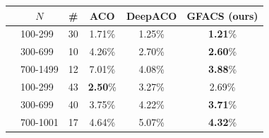 



\begin{tabular}{clcccc}
\midrule
& \multicolumn{1}{c}{$N$} & \# & ACO & DeepACO & GFACS (ours) \\
\midrule
\parbox[t]{2mm}{} & 100-299 & 30& 1.71\%& 1.25\%& \textbf{1.21}\% \\
& 300-699 & 10 & 4.26\% &2.70\% & \textbf{2.60}\% \\
& 700-1499 & 12 &7.01\% &4.08\% & \textbf{3.88}\% \\
\midrule
\parbox[t]{2mm}{} & 100-299 & 43 &\textbf{2.50}\% &3.27\% & 2.69\% \\
& 300-699 & 40 &3.75\% &4.22\% & \textbf{3.71}\% \\
& 700-1001 & 17 &4.64\% &5.07\% & \textbf{4.32}\% \\

\bottomrule
\end{tabular}



